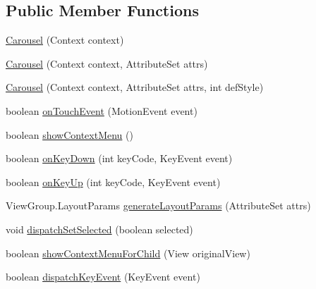 \subsection*{Public Member Functions}
\begin{DoxyCompactItemize}
\item 
\hyperlink{classcom_1_1zia_1_1freshdocs_1_1widget_1_1fileexplorer_1_1carousel_1_1_carousel_a8384394867ff9479b98551080eb30fe7}{Carousel} (Context context)
\item 
\hyperlink{classcom_1_1zia_1_1freshdocs_1_1widget_1_1fileexplorer_1_1carousel_1_1_carousel_accbd71fe7dab584047024dad5308ea63}{Carousel} (Context context, Attribute\-Set attrs)
\item 
\hyperlink{classcom_1_1zia_1_1freshdocs_1_1widget_1_1fileexplorer_1_1carousel_1_1_carousel_a675bc3f81325bba6357c62c441c12b46}{Carousel} (Context context, Attribute\-Set attrs, int def\-Style)
\item 
boolean \hyperlink{classcom_1_1zia_1_1freshdocs_1_1widget_1_1fileexplorer_1_1carousel_1_1_carousel_a7951a7b622a57670a8c5024807d48ce1}{on\-Touch\-Event} (Motion\-Event event)
\item 
boolean \hyperlink{classcom_1_1zia_1_1freshdocs_1_1widget_1_1fileexplorer_1_1carousel_1_1_carousel_add5a2cd054c4b0128af8c62d4fd3fac6}{show\-Context\-Menu} ()
\item 
boolean \hyperlink{classcom_1_1zia_1_1freshdocs_1_1widget_1_1fileexplorer_1_1carousel_1_1_carousel_a6b3b25da5a3f0ed13b67ffe07ad969cb}{on\-Key\-Down} (int key\-Code, Key\-Event event)
\item 
boolean \hyperlink{classcom_1_1zia_1_1freshdocs_1_1widget_1_1fileexplorer_1_1carousel_1_1_carousel_a5c56d6a0858ac624e12c7e4189481f33}{on\-Key\-Up} (int key\-Code, Key\-Event event)
\item 
View\-Group.\-Layout\-Params \hyperlink{classcom_1_1zia_1_1freshdocs_1_1widget_1_1fileexplorer_1_1carousel_1_1_carousel_a5936931c1e0141a9e27733b084d419bb}{generate\-Layout\-Params} (Attribute\-Set attrs)
\item 
void \hyperlink{classcom_1_1zia_1_1freshdocs_1_1widget_1_1fileexplorer_1_1carousel_1_1_carousel_ac6bdfbeeceb505589a7e41b42fbb0141}{dispatch\-Set\-Selected} (boolean selected)
\item 
boolean \hyperlink{classcom_1_1zia_1_1freshdocs_1_1widget_1_1fileexplorer_1_1carousel_1_1_carousel_a131c406488c5f6633d2a96465ae305ab}{show\-Context\-Menu\-For\-Child} (View original\-View)
\item 
boolean \hyperlink{classcom_1_1zia_1_1freshdocs_1_1widget_1_1fileexplorer_1_1carousel_1_1_carousel_ab1efea04078fc36371ca529627881c98}{dispatch\-Key\-Event} (Key\-Event event)

\end{DoxyCompactItemize}
